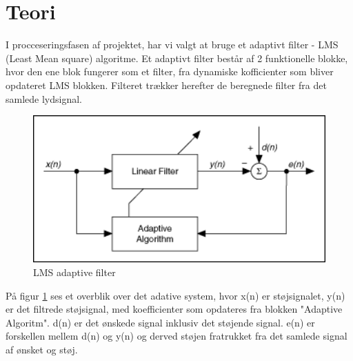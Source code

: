 \newpage

\section{Teori}
I procceseringsfasen af projektet, har vi valgt at bruge et adaptivt filter - LMS (Least Mean square) algoritme. Et adaptivt filter består af 2 funktionelle blokke, hvor den ene blok fungerer som et filter, fra dynamiske kofficienter som bliver opdateret LMS blokken.  Filteret trækker herefter de beregnede filter fra det samlede lydsignal. 
   

\begin{figure}[H]
	\centering
	\includegraphics[width = 400pt]{Img/Figures}
	\caption{LMS adaptive filter}
	\label{fig:LMS_filter}
\end{figure}

På figur \ref{fig:LMS_filter} ses et overblik over det adative system, hvor x(n) er støjsignalet, y(n) er det filtrede støjsignal, med koefficienter som opdateres fra blokken "Adaptive Algoritm". d(n) er det ønskede signal inklusiv det støjende signal. e(n) er forskellen mellem d(n) og y(n) og derved støjen fratrukket fra det samlede signal af ønsket og støj.  